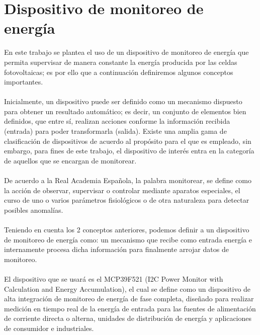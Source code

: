 \section{Dispositivo de monitoreo de energía}
En este trabajo se plantea el uso de un dispositivo de monitoreo de energía que permita supervisar de manera constante la energía producida por las celdas fotovoltaicas; es por ello que a continuación definiremos algunos conceptos importantes.
\paragraph{}
Inicialmente, un dispositivo puede ser definido como un mecanismo dispuesto para obtener un resultado automático\citep{MarcoTeorico11}; es decir, un conjunto de elementos bien definidos, que entre sí, realizan acciones conforme la información recibida (entrada) para poder transformarla (salida).
Existe una amplia gama de clasificación de dispositivos de acuerdo al propósito para el que es empleado, sin embargo, para fines de este trabajo, el dispositivo de interés entra en la categoría de aquellos que se encargan de monitorear. 
\paragraph{}
De acuerdo a la Real Academia Española, la palabra monitorear, se define como la acción de observar, supervisar o controlar mediante aparatos especiales, el curso de uno o varios parámetros fisiológicos o de otra naturaleza para detectar posibles anomalías.\citep{MarcoTeorico12}
\paragraph{}
Teniendo en cuenta los 2 conceptos anteriores, podemos definir a un dispositivo de monitoreo de energía como: un mecanismo que recibe como entrada energía e internamente procesa dicha información para finalmente arrojar datos de monitoreo.
\paragraph{}
El dispositivo que se usará es el MCP39F521 (I2C Power Monitor with Calculation and Energy Accumulation), el cual se define como un dispositivo de alta integración de monitoreo de energía de fase completa, diseñado para realizar medición en tiempo real de la energía de entrada para las fuentes de alimentación de corriente directa o alterna, unidades de distribución de energía y aplicaciones de consumidor e industriales.\citep{MarcoTeorico13}
